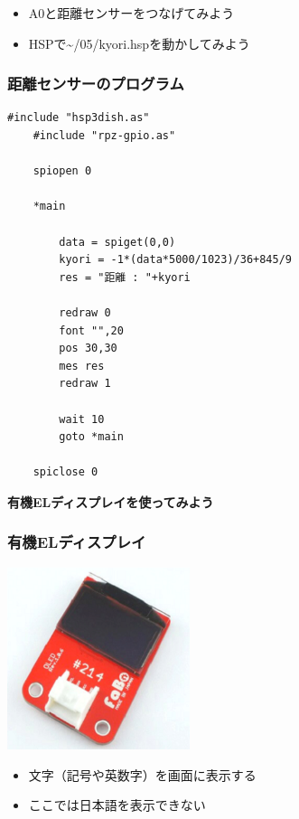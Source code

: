 \begin{frame}[fragile]
\begin{columns}
\begin{column}{0.48\textwidth}
        \end{column}
    \end{columns}
    \begin{itemize}
        \item A0と距離センサーをつなげてみよう
        \item HSPで\textasciitilde/05/kyori.hspを動かしてみよう
    \end{itemize}
\end{frame}

\begin{frame}[fragile]
    \frametitle{距離センサーのプログラム}
    \begin{lstlisting}[title=\textasciitilde/05/kyori.hsp]
    #include "hsp3dish.as"
    #include "rpz-gpio.as"

    spiopen 0

    *main

	    data = spiget(0,0)
	    kyori = -1*(data*5000/1023)/36+845/9
	    res = "距離 : "+kyori
	
	    redraw 0
	    font "",20
	    pos 30,30
	    mes res
	    redraw 1

	    wait 10
	    goto *main

    spiclose 0
    \end{lstlisting}
\end{frame}

\begin{frame}[plain]
    \begin{center}
        \vspace{48pt}
        {\huge\bf 有機ELディスプレイを使ってみよう}
    \end{center}
\end{frame}

\begin{frame}
    \frametitle{有機ELディスプレイ}
    \begin{center}
        \includegraphics[width=0.4\textwidth]{images/chap05/text05-img025.png}
        \begin{itemize}
            \item 文字（記号や英数字）を画面に表示する
            \item ここでは日本語を表示できない
        \end{itemize}
    \end{center}
\end{frame}

